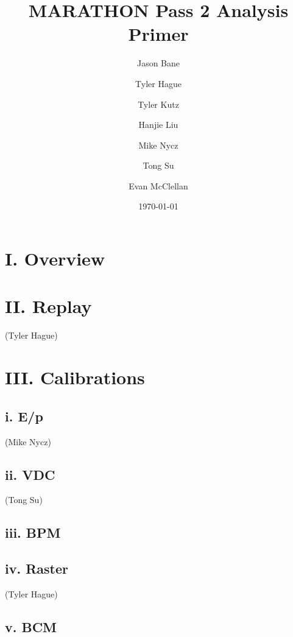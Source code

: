 \documentclass[letterpaper,aps,prl,superscriptaddress,floatfix,twocolumn]{revtex4}
\begin{document}
\title{MARATHON Pass 2 Analysis Primer}

\author{Jason Bane}
\author{Tyler Hague}
\author{Tyler Kutz}
\author{Hanjie Liu}
\author{Mike Nycz}
\author{Tong Su}

\author{Evan McClellan}


\date{\today}

\begin{abstract}
\end{abstract}

\maketitle

\section{I. Overview}

\section{II. Replay}
 (Tyler Hague)

\section{III. Calibrations}

 \subsection{i. E/p}
 (Mike Nycz)

 \subsection{ii. VDC}
(Tong Su)


 \subsection{iii. BPM}


 \subsection{iv. Raster}
 (Tyler Hague)
 


 \subsection{v. BCM}

\end{document}
